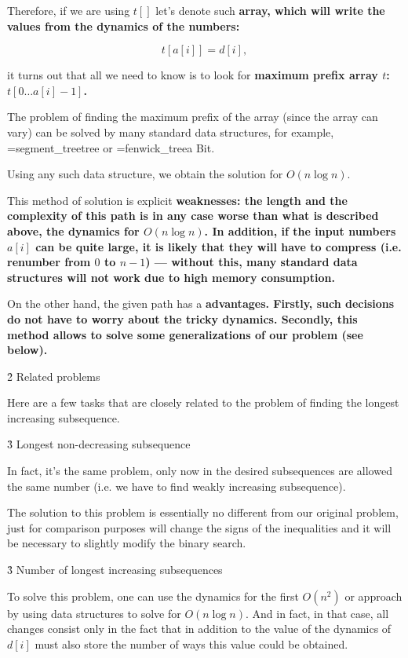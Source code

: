 Therefore, if we are using $t[]$ let's denote such \bf{array}, which will write the values from the dynamics of the numbers:

$$ t[a[i]] = d[i], $$

it turns out that all we need to know is to look for \bf{maximum prefix} array $t$: $t[0 \ldots a[i]-1]$.

The problem of finding the maximum prefix of the array (since the array can vary) can be solved by many standard data structures, for example, \algohref=segment_tree{tree} or \algohref=fenwick_tree{a Bit}.

Using any such data structure, we obtain the solution for $O (n \log n)$.

This method of solution is explicit \bf{weaknesses}: the length and the complexity of this path is in any case worse than what is described above, the dynamics for $O (n \log n)$. In addition, if the input numbers $a[i]$ can be quite large, it is likely that they will have to compress (i.e. renumber from $0$ to $n-1$) --- without this, many standard data structures will not work due to high memory consumption.

On the other hand, the given path has a \bf{advantages}. Firstly, such decisions do not have to worry about the tricky dynamics. Secondly, this method allows to solve some generalizations of our problem (see below).



\h2{ Related problems }

Here are a few tasks that are closely related to the problem of finding the longest increasing subsequence.


\h3{ Longest non-decreasing subsequence }

In fact, it's the same problem, only now in the desired subsequences are allowed the same number (i.e. we have to find weakly increasing subsequence).

The solution to this problem is essentially no different from our original problem, just for comparison purposes will change the signs of the inequalities and it will be necessary to slightly modify the binary search.


\h3{ Number of longest increasing subsequences }

To solve this problem, one can use the dynamics for the first $O (n^2)$ or approach by using data structures to solve for $O (n \log n)$. And in fact, in that case, all changes consist only in the fact that in addition to the value of the dynamics of $d[i]$ must also store the number of ways this value could be obtained.

